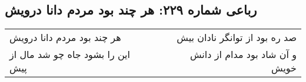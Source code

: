 \begin{center}
\section*{رباعی شماره ۲۲۹: هر چند بود مردم دانا درویش}
\label{sec:sh229}
\begin{longtable}{l p{0.5cm} r}
هر چند بود مردم دانا درویش
&&
صد ره بود از توانگر نادان بیش
\\
این را بشود جاه چو شد مال از پیش
&&
و آن شاد بود مدام از دانش خویش
\\
\end{longtable}
\end{center}
